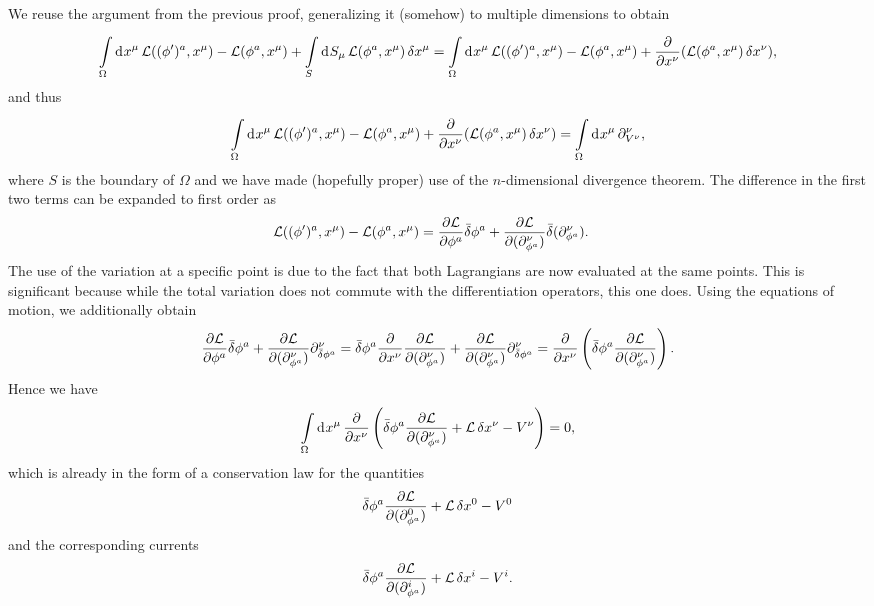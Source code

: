 We reuse the argument from the previous proof, generalizing it (somehow) to multiple dimensions to obtain
\begin{align*}
	\int\limits_{\Omega}^{}\dd[]{x^{\mu}}\mathcal{L}((\phi^{\prime})^{a}, x^{\mu}) - \mathcal{L}(\phi^{a}, x^{\mu}) + \int\limits_{S}^{}\dd[]{S_{\mu}}\mathcal{L}(\phi^{a}, x^{\mu})\var{x^{\mu}} = \int\limits_{\Omega}^{}\dd[]{x^{\mu}}\mathcal{L}((\phi^{\prime})^{a}, x^{\mu}) - \mathcal{L}(\phi^{a}, x^{\mu}) + \pdv{x^{\nu}}(\mathcal{L}(\phi^{a}, x^{\mu})\var{x^{\nu}}),
\end{align*}
and thus
\begin{align*}
	\int\limits_{\Omega}^{}\dd[]{x^{\mu}}\mathcal{L}((\phi^{\prime})^{a}, x^{\mu}) - \mathcal{L}(\phi^{a}, x^{\mu}) + \pdv{x^{\nu}}(\mathcal{L}(\phi^{a}, x^{\mu})\var{x^{\nu}}) = \int\limits_{\Omega}^{}\dd[]{x^{\mu}}\partial^{\nu}_{V^{\nu}},
\end{align*}
where $S$ is the boundary of $\Omega$ and we have made (hopefully proper) use of the $n$-dimensional divergence theorem. The difference in the first two terms can be expanded to first order as
\begin{align*}
	\mathcal{L}((\phi^{\prime})^{a}, x^{\mu}) - \mathcal{L}(\phi^{a}, x^{\mu}) &= \pdv{\ensuremath{\mathcal{L}}}{\phi^{a}}\bar{\delta}\phi^{a} + \pdv{\ensuremath{\mathcal{L}}}{(\ensuremath{\partial^{\nu}_{\phi^{a}}})}\bar{\delta}(\partial^{\nu}_{\phi^{a}}).
\end{align*}
The use of the variation at a specific point is due to the fact that both Lagrangians are now evaluated at the same points. This is significant because while the total variation does not commute with the differentiation operators, this one does. Using the equations of motion, we additionally obtain
\begin{align*}
	\pdv{\ensuremath{\mathcal{L}}}{\phi^{a}}\bar{\delta}\phi^{a} + \pdv{\ensuremath{\mathcal{L}}}{(\ensuremath{\partial^{\nu}_{\phi^{a}}})}\partial^{\nu}_{\bar{\delta}\phi^{a}} = \bar{\delta}\phi^{a}\pdv{x^{\nu}}\pdv{\ensuremath{\mathcal{L}}}{(\ensuremath{\partial^{\nu}_{\phi^{a}}})} + \pdv{\ensuremath{\mathcal{L}}}{(\ensuremath{\partial^{\nu}_{\phi^{a}}})}\partial^{\nu}_{\bar{\delta}\phi^{a}} = \pdv{x^{\nu}}\left(\bar{\delta}\phi^{a}\pdv{\ensuremath{\mathcal{L}}}{(\ensuremath{\partial^{\nu}_{\phi^{a}}})}\right).
\end{align*}
Hence we have
\begin{align*}
	\int\limits_{\Omega}^{}\dd[]{x^{\mu}}\pdv{x^{\nu}}\left(\bar{\delta}\phi^{a}\pdv{\ensuremath{\mathcal{L}}}{(\ensuremath{\partial^{\nu}_{\phi^{a}}})} + \mathcal{L}\var{x^{\nu}} - V^{\nu}\right) = 0,
\end{align*}
which is already in the form of a conservation law for the quantities
\begin{align*}
	\bar{\delta}\phi^{a}\pdv{\ensuremath{\mathcal{L}}}{(\ensuremath{\partial^{0}_{\phi^{a}}})} + \mathcal{L}\var{x^{0}} - V^{0}
\end{align*}
and the corresponding currents
\begin{align*}
	\bar{\delta}\phi^{a}\pdv{\ensuremath{\mathcal{L}}}{(\ensuremath{\partial^{i}_{\phi^{a}}})} + \mathcal{L}\var{x^{i}} - V^{i}.
\end{align*}

